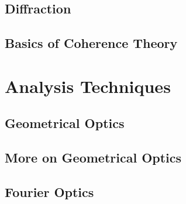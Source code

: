\documentclass[12pt]{report}
\begin{document}
\chapter{Diffraction}
\chapter{Basics of Coherence Theory}

\part{Analysis Techniques}
\chapter{Geometrical Optics}
\chapter{More on Geometrical Optics}
\chapter{Fourier Optics}
\end{document}
